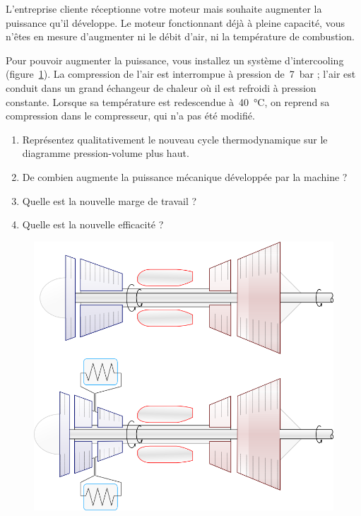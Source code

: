 	\onlyframabook{\pagebreak}%
	L’entreprise cliente réceptionne votre moteur mais souhaite augmenter la puissance qu’il développe. Le moteur fonctionnant déjà à pleine capacité, vous n’êtes en mesure d’augmenter ni le débit d’air, ni la température de combustion.
	
	Pour pouvoir augmenter la puissance, vous installez un système d’intercooling (figure~\ref{fig_turbomoteurs_exercice}). La compression de l’air est interrompue à pression de~\SI{7}{\bar} ; l’air est conduit dans un grand échangeur de chaleur où il est refroidi à pression constante. Lorsque sa température est redescendue à~\SI{40}{\celsius}, on reprend sa compression dans le compresseur, qui n’a pas été modifié.
	
	\begin{enumerate}
		\item Représentez qualitativement le nouveau cycle thermodynamique sur le diagramme pression-volume plus haut.
		\item De combien augmente la puissance mécanique développée par la machine ?
		\item Quelle est la nouvelle marge de travail ?
		\item Quelle est la nouvelle efficacité ?
	\end{enumerate}
	
	\onlyframabook{\pagebreak}%
	\begin{figure}[htc!]%
		\begin{center}
		\includegraphics[width=12cm]{images/circuit_turboshaft_exercice.png}
		\end{center}
		\label{fig_turbomoteurs_exercice}
	\end{figure}

